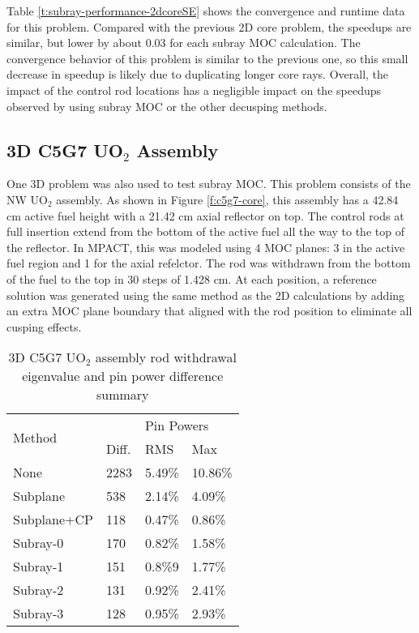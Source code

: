 Table \ref{t:subray-performance-2dcoreSE} shows the convergence and runtime data for this problem.  Compared with the previous 2D core problem, the speedups are similar, but lower by about 0.03 for each subray MOC calculation.  The convergence behavior of this problem is similar to the previous one, so this small decrease in speedup is likely due to duplicating longer core rays.  Overall, the impact of the control rod locations has a negligible impact on the speedups observed by using subray MOC or the other decusping methods.

\subsection{3D C5G7 UO\texorpdfstring{$_2$}{2} Assembly}

One 3D problem was also used to test subray MOC.  This problem consists of the NW UO$_2$ assembly.  As shown in Figure \ref{f:c5g7-core}, this assembly has a 42.84 cm active fuel height with a 21.42 cm axial reflector on top.  The control rods at full insertion extend from the bottom of the active fuel all the way to the top of the reflector.  In MPACT, this was modeled using 4 MOC planes: 3 in the active fuel region and 1 for the axial refelctor.  The rod was withdrawn from the bottom of the fuel to the top in 30 steps of 1.428 cm.  At each position, a reference solution was generated using the same method as the 2D calculations by adding an extra MOC plane boundary that aligned with the rod position to eliminate all cusping effects.

\begin{table}
    \centering
    \caption[3D C5G7 UO$_2$ Assembly Recombination Sensitivity]{3D C5G7 UO$_2$ assembly rod withdrawal eigenvalue and pin power difference summary}\label{t:c5g7-3d-assembly}
    \begin{tabular}{l l l l}\toprule
        \multirow{2}{*}{Method} & \keff{} & \multicolumn{2}{l}{Pin Powers} \\
         & Diff. & RMS & Max \\\midrule
         None & 2283 & 5.49\% & 10.86\% \\
         Subplane & 538 & 2.14\% & 4.09\% \\
         Subplane+CP & 118 & 0.47\% & 0.86\% \\
         Subray-0 & 170 & 0.82\% & 1.58\% \\
         Subray-1 & 151 & 0.8\%9 & 1.77\% \\
         Subray-2 & 131 & 0.92\% & 2.41\% \\
         Subray-3 & 128 & 0.95\% & 2.93\% \\
         \bottomrule
    \end{tabular}
\end{table}

